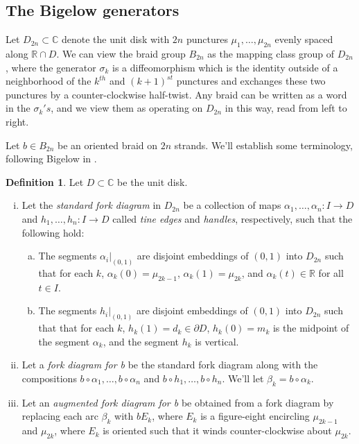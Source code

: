 \documentclass[11pt]{article}
\theoremstyle{plain} \newtheorem{thm}{Theorem}[subsection]
\theoremstyle{plain} \newtheorem{cor}[thm]{Corollary}
\theoremstyle{plain} \newtheorem{prop}[thm]{Proposition}
\theoremstyle{plain} \newtheorem{conj}[thm]{Conjecture}
\theoremstyle{plain} \newtheorem{lem}[thm]{Lemma}
\theoremstyle{definition} \newtheorem{df}[thm]{Definition}
\theoremstyle{remark} \newtheorem{rmk}[thm]{Remark}
\theoremstyle{remark} \newtheorem{obs}[thm]{Observation}
\newcommand{\Bn}{B_{2n}}
\newcommand{\B}[1]{B_{#1} }
\begin{document}
\subsection{The Bigelow generators}\label{sec:biggen}
Let $D_{2n} \subset \mathbb{C}$ denote the unit disk with $2n$ punctures $\mu_{1} , \ldots, \mu_{2n}$ evenly spaced along $\mathbb{R} \cap D$.  We can view the braid group $\B{2n}$ as the mapping class group of $D_{2n}$, where the generator $\sigma_{k}$ is a diffeomorphism which is the identity outside of a neighborhood of the $k^{th}$ and $(k+1)^{st}$ punctures and exchanges these two punctures by a counter-clockwise half-twist.  Any braid can be written as a word in the $\sigma_{k}'s$, and we view them as operating on $D_{2n}$ in this way, read from left to right.

Let $b \in \Bn$ be an oriented braid on $2n$ strands.  We'll establish some terminology, following Bigelow in \cite{big:jones}.
\begin{df}\label{defforks}
Let $D \subset \mathbb{C}$ be the unit disk.
\begin{enumerate}[(i)]
\item Let the \textit{standard fork diagram} in $D_{2n}$ be a collection of maps $\alpha_{1}, \ldots ,\alpha_{n}:I \rightarrow D$ and $h_{1}, \ldots , h_{n}:I \rightarrow D$ called \textit{tine edges} and \textit{handles}, respectively, such that the following hold:
\begin{enumerate}[(a)]
  \item The segments $\alpha_{i}|_{(0,1)}$ are disjoint embeddings of $(0,1)$ into $D_{2n}$ such that for each $k$, $\alpha_{k}(0) = \mu_{2k-1}$, $\alpha_{k}(1) = \mu_{2k}$, and $\alpha_{k}(t) \in \mathbb{R}$ for all $t \in I$.
\item The segments $h_{i}|_{(0,1)}$ are disjoint embeddings of $(0,1)$ into $D_{2n}$ such that that for each $k$, $h_{k}(1) = d_{k} \in \partial D$, $h_{k}(0) = m_{k}$ is the midpoint of the segment $\alpha_{k}$, and the segment $h_{k}$ is vertical.
\end{enumerate}
\item Let a \textit{fork diagram for b} be the standard fork diagram along with the compositions $b \circ \alpha_{1}, \ldots, b \circ \alpha_{n}$ and $b \circ h_{1}, \ldots, b \circ h_{n}$.  We'll let $\beta_{k} = b \circ \alpha_{k}$.
\item Let an \textit{augmented fork diagram for b} be obtained from a fork diagram by replacing each arc $\beta_{k}$ with $bE_{k}$, where $E_{k}$ is a figure-eight encircling $\mu_{2k-1}$ and $\mu_{2k}$, where $E_{k}$ is oriented such that it winds counter-clockwise about $\mu_{2k}$.
\end{enumerate}
\end{df}
\end{document}
